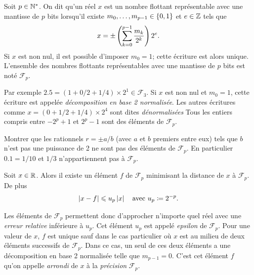 \documentclass{magnolia}
\begin{document}


\begin{definition}
Soit $p\in{\mathbb{N}^*}$. On dit qu'un réel $x$ est un nombre flottant représentable avec une mantisse de $p$ bits lorsqu'il existe $m_0,\ldots,m_{p-1}\in\left\{0,1\right\}$ et $e\in\mathbb{Z}$ tels que
\[x=\pm\left(\sum_{k=0}^{p-1} \frac{m_k}{2^k}\right)2^e.\]
Si $x$ est non nul, il est possible d'imposer $m_0=1$; cette écriture est alors unique. L'ensemble des nombres flottants représentables avec une mantisse de $p$ bits est noté $\mathcal{F}_p$.  
\end{definition}

\begin{remarques}
\remarque 
  Par exemple $2.5=(1+0/2+1/4)\times 2^1\in\mathcal{F}_3$.
\remarque Si $x$ est non nul et $m_0=1$, cette écriture est appelée
  \emph{décomposition en base 2 normalisée}. Les autres écritures comme
  $x = (0 + 1/2 + 1/4)\times 2^4$ sont dites \emph{dénormalisées}
\remarque Tous les entiers compris entre $-2^p+1$ et $2^p-1$ sont des éléments de $\mathcal{F}_p$.
\end{remarques}

\begin{exoUnique}
\exo Montrer que les rationnels $r=\pm a/b$ (avec $a$ et $b$ premiers entre eux) tels que $b$ n'est pas une puissance de 2 ne sont pas des éléments de $\mathcal{F}_p$. En particulier $0.1=1/10$ et $1/3$ n'appartiennent pas à $\mathcal{F}_p$.
\end{exoUnique}



\begin{proposition}
  Soit $x\in\mathbb{R}$. Alors il existe un élément $f$ de $\mathcal{F}_p$ minimisant la distance de $x$ à $\mathcal{F}_p$. De plus
  \[\left|x-f\right|\leqslant u_p\left|x\right| \quad\text{avec $u_p\coloneqq 2^{-p}$}.\]
  \end{proposition}

\begin{remarques}
\remarque Les éléments de $\mathcal{F}_p$ permettent donc d'approcher
  n'importe quel réel avec une \emph{erreur relative} inférieure à $u_p$. Cet
  élément $u_p$ est appelé \emph{epsilon} de $\mathcal{F}_p$.
\remarque Pour une valeur de $x$, $f$ est unique sauf dans le cas particulier où $x$
  est au milieu de deux éléments successifs de $\mathcal{F}_p$. Dans ce cas, un seul de
  ces deux éléments a une décomposition en base 2 normalisée telle que $m_{p-1}=0$.
  C'est cet élément $f$ qu'on appelle \emph{arrondi} de $x$ à la \emph{précision}
  $\mathcal{F}_p$.
\end{remarques}
\end{document}
